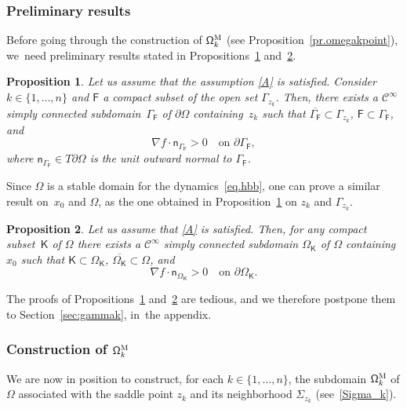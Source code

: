 \documentclass[JEP,XML,SOM,Unicode,NoEqCountersInSection,NoFloatCountersInSection,published]{cedram}
\let\pa\partial
\theoremstyle{plain}
\newtheorem{proposition}{Proposition}
\theoremstyle{definition}
\begin{document}
\subsubsection{Preliminary results}
Before going through the construction of $\mathsf \Omega_k^{\textsc{M}}$ (see Proposition~\ref{pr.omegakpoint}), we~need preliminary results stated in Propositions~\ref{pr.gammak} and~\ref{pr.omegak}.

\begin{proposition}\label{pr.gammak}
Let us assume that the assumption \ref{A} is satisfied. Consider $k\in \{1,\ldots,n\}$ and $\mathsf F$ a compact subset of the open set $\Gamma_{z_k}$. Then, there exists a $\mathcal C^\infty$ simply connected subdomain~$\Gamma_{\mathsf F}$ of $\partial \Omega$ containing~$z_k$ such that $ \overline {\Gamma_{\mathsf F}} \subset \Gamma_{z_k}$, ${\mathsf F}\subset \Gamma_{\mathsf F}$, and
\begin{equation}\label{eq.ultrastable}
\nabla f\cdot \mathsf n_{ \Gamma_{\mathsf F} }>0 \quad\text{on } \pa \Gamma_{\mathsf F},
\end{equation}
where $\mathsf n_{ \Gamma_{\mathsf F}}\in T\partial \Omega$ is the
unit outward normal to $ \Gamma_{\mathsf F}$.
\end{proposition}
Since $\Omega$ is a stable domain for the dynamics~\eqref{eq.hbb},
one can prove a similar result on~$x_0$ and $\Omega$, as the one
obtained in Proposition~\ref{pr.gammak} on $z_k$ and $\Gamma_{z_k}$.

\begin{proposition}\label{pr.omegak}
Let us assume that \ref{A} is satisfied. Then, for any compact subset~$\mathsf K$ of $\Omega$ there exists a $\mathcal C^\infty $ simply connected subdomain $\Omega_{\mathsf K}$ of $\Omega$ containing $x_0$ such that $\mathsf K\subset \Omega_{\mathsf K}$, $\overline{\Omega_{\mathsf K}}\subset \Omega$, and
\[
\nabla f\cdot \mathsf n_{ \Omega_{\mathsf K}}> 0 \quad\text{on } \partial \Omega_{\mathsf K}.
\]
\end{proposition}

The proofs of Propositions~\ref{pr.gammak} and~\ref{pr.omegak} are
tedious, and we therefore postpone them to Section~\ref{sec:gammak}, in~the appendix.

\subsubsection{Construction of $\mathsf \Omega_k^{\textsc{M}}$}
We are now in position to construct, for each $k\in \{1,\ldots,n\}$,
the subdomain $\mathsf \Omega_k^{\textsc{M}}$ of $\Omega$ associated
with the saddle point $z_k$ and its neighborhood $\Sigma_{z_k}$ (see~\eqref{Sigma_k}).
\end{document}
